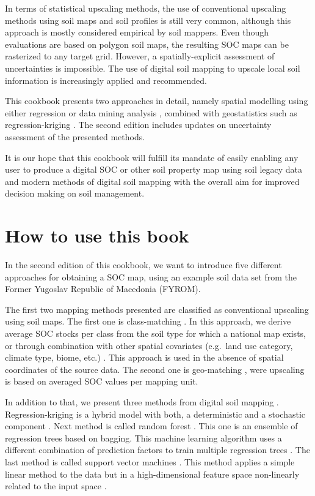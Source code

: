 \documentclass[10pt,b5paper,]{book}
\theoremstyle{definition}
\theoremstyle{definition}
\theoremstyle{definition}
\theoremstyle{remark}
\begin{document}
In terms of statistical upscaling methods, the use of conventional
upscaling methods using soil maps and soil profiles is still very
common, although this approach is mostly considered empirical by soil
mappers. Even though evaluations are based on polygon soil maps, the
resulting SOC maps can be rasterized to any target grid. However, a
spatially-explicit assessment of uncertainties is impossible. The use of
digital soil mapping to upscale local soil information is increasingly
applied and recommended.

This cookbook presents two approaches in detail, namely spatial
modelling using either regression or data mining analysis
, combined with geostatistics such as
regression-kriging . The second edition
includes updates on uncertainty assessment of the presented methods.

It is our hope that this cookbook will fulfill its mandate of easily
enabling any user to produce a digital SOC or other soil property map
using soil legacy data and modern methods of digital soil mapping
 with the overall aim for improved
decision making on soil management.

\hypertarget{how-to-use-this-book}{%
\section{How to use this book}\label{how-to-use-this-book}}

In the second edition of this cookbook, we want to introduce five
different approaches for obtaining a SOC map, using an example soil data
set from the Former Yugoslav Republic of Macedonia (FYROM).

The first two mapping methods presented are classified as conventional
upscaling using soil maps. The first one is class-matching
. In this approach, we derive average SOC stocks
per class from the soil type for which a national map exists, or through
combination with other spatial covariates (e.g.~land use category,
climate type, biome, etc.) . This
approach is used in the absence of spatial coordinates of the source
data. The second one is geo-matching , were
upscaling is based on averaged SOC values per mapping unit.

In addition to that, we present three methods from digital soil mapping
. Regression-kriging
 is a hybrid model with both, a
deterministic and a stochastic component \citep{hengl2007regression}.
Next method is called random forest . This one
is an ensemble of regression trees based on bagging. This machine
learning algorithm uses a different combination of prediction factors to
train multiple regression trees \citep{Breiman1996}. The last method is
called support vector machines .
This method applies a simple linear method to the data but in a
high-dimensional feature space non-linearly related to the input space
\citep{Karatzoglou2006}.
\end{document}
